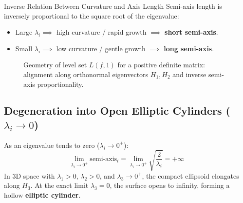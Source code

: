 \begin{noteblock}{Inverse Relation Between Curvature and Axis Length}
Semi-axis length is inversely proportional to the square root of the eigenvalue:
\begin{itemize}
    \item Large $\lambda_i \implies$ high curvature / rapid growth $\implies$ \textbf{short semi-axis}.
    \item Small $\lambda_i \implies$ low curvature / gentle growth $\implies$ \textbf{long semi-axis}.
\end{itemize}
\end{noteblock}

\begin{figure}[H]
\centering
{}
\caption{Geometry of level set $L(f, 1)$ for a positive definite matrix: alignment along orthonormal eigenvectors $H_1, H_2$ and inverse semi-axis proportionality.}
\label{fig:ellipsoid-eigenvectors-en}
\end{figure}

\subsection{Degeneration into Open Elliptic Cylinders (\texorpdfstring{$\lambda_i \to 0$}{lambda -> 0})}
As an eigenvalue tends to zero ($\lambda_i \to 0^+$):
\begin{equation}
\lim_{\lambda_i \to 0^+} \text{semi-axis}_i = \lim_{\lambda_i \to 0^+} \sqrt{\frac{2}{\lambda_i}} = +\infty
\end{equation}
In 3D space with $\lambda_1 > 0$, $\lambda_2 > 0$, and $\lambda_3 \to 0^+$, the compact ellipsoid elongates along $H_3$. At the exact limit $\lambda_3 = 0$, the surface opens to infinity, forming a hollow \textbf{elliptic cylinder}.

